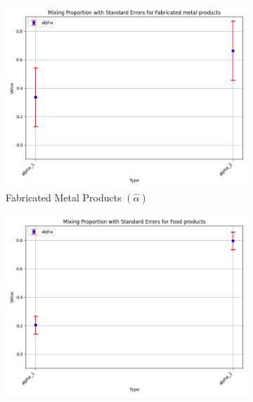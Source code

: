 \documentclass{article}
\begin{document}
\begin{figure}[ht!]
    \centering 
    \caption{AR(1) Normal Model with $\log K$, Import and CIIU}
    \begin{subfigure}[t]{0.32\textwidth}
        \centering
        \includegraphics[width=\textwidth]{figure/empirical_ar1_normal_kmshare_ciiu_alpha_with_error_bars_Fabricated metal products.png}
        \caption{Fabricated Metal Products $(\hat\alpha)$}
    \end{subfigure}
    \begin{subfigure}[t]{0.32\textwidth}
        \centering
        \includegraphics[width=\textwidth]{figure/empirical_ar1_normal_kmshare_ciiu_alpha_with_error_bars_Food products.png}

\end{subfigure}
\end{figure}
\end{document}
